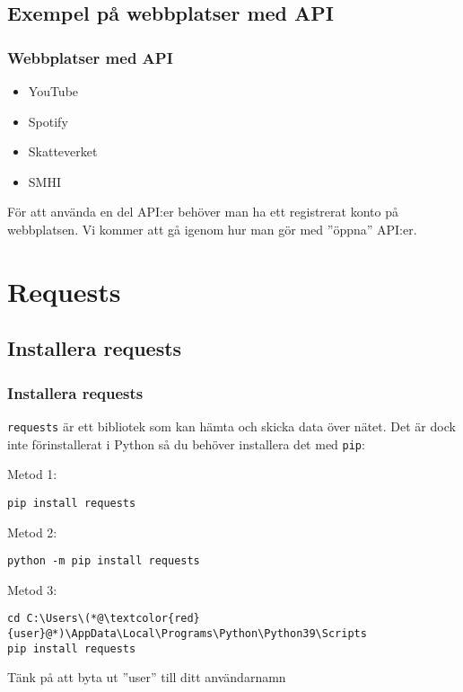 \documentclass[aspectratio=169]{beamer}
\begin{document}
\subsection{Exempel på webbplatser med API}

\begin{frame}
\frametitle{Webbplatser med API}

\begin{itemize}
	\item YouTube
	\item Spotify
	\item Skatteverket
	\item SMHI
\end{itemize}

För att använda en del API:er behöver man ha ett registrerat konto på webbplatsen. Vi kommer att gå igenom hur man gör med ''öppna'' API:er.

\end{frame}

\section{Requests}

\subsection{Installera requests}

\begin{frame}[fragile]
\frametitle{Installera requests}

\texttt{requests} är ett bibliotek som kan hämta och skicka data över nätet. Det är dock inte förinstallerat i Python så du behöver installera det med \texttt{pip}:

Metod 1:
\begin{lstlisting}
pip install requests
\end{lstlisting}

Metod 2:
\begin{lstlisting}
python -m pip install requests
\end{lstlisting}

Metod 3:
\begin{lstlisting}
cd C:\Users\(*@\textcolor{red}{user}@*)\AppData\Local\Programs\Python\Python39\Scripts
pip install requests
\end{lstlisting}

Tänk på att byta ut ''user'' till ditt användarnamn


\end{frame}
\end{document}
